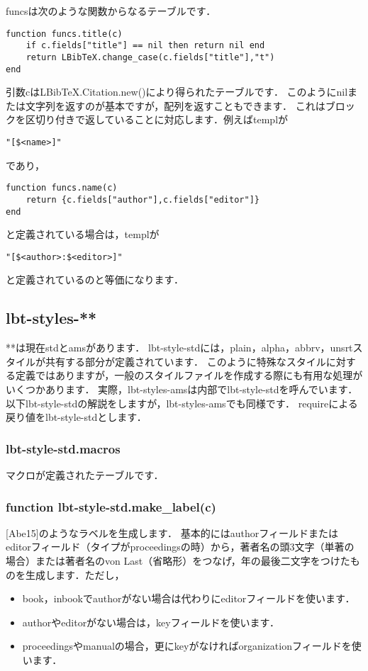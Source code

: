 \documentclass[dvipdfmx,a4paper]{jsarticle}
\begin{document}
funcsは次のような関数からなるテーブルです．
\begin{lstlisting}
function funcs.title(c)
	if c.fields["title"] == nil then return nil end
	return LBibTeX.change_case(c.fields["title"],"t")
end
\end{lstlisting}
引数cはLBibTeX.Citation.new()により得られたテーブルです．
このようにnilまたは文字列を返すのが基本ですが，配列を返すこともできます．
これはブロックを区切り付きで返していることに対応します．例えばtemplが
\begin{lstlisting}
"[$<name>]"
\end{lstlisting}
であり，
\begin{lstlisting}
function funcs.name(c)
	return {c.fields["author"],c.fields["editor"]}
end
\end{lstlisting}
と定義されている場合は，templが
\begin{lstlisting}
"[$<author>:$<editor>]"
\end{lstlisting}
と定義されているのと等価になります．

\subsection{lbt-styles-**}
**は現在stdとamsがあります．
lbt-style-stdには，plain，alpha，abbrv，unsrtスタイルが共有する部分が定義されています．
このように特殊なスタイルに対する定義ではありますが，一般のスタイルファイルを作成する際にも有用な処理がいくつかあります．
実際，lbt-styles-amsは内部でlbt-style-stdを呼んでいます．
以下lbt-style-stdの解説をしますが，lbt-styles-amsでも同様です．
requireによる戻り値をlbt-style-stdとします．
\subsubsection{lbt-style-std.macros}
マクロが定義されたテーブルです．

\subsubsection{function lbt-style-std.make\_label(c)}
[Abe15]のようなラベルを生成します．
基本的にはauthorフィールドまたはeditorフィールド（タイプがproceedingsの時）から，著者名の頭3文字（単著の場合）または著者名のvon Last（省略形）をつなげ，年の最後二文字をつけたものを生成します．ただし，
\begin{itemize}
\item book，inbookでauthorがない場合は代わりにeditorフィールドを使います．
\item authorやeditorがない場合は，keyフィールドを使います．
\item proceedingsやmanualの場合，更にkeyがなければorganizationフィールドを使います．
\end{itemize}
\end{document}
